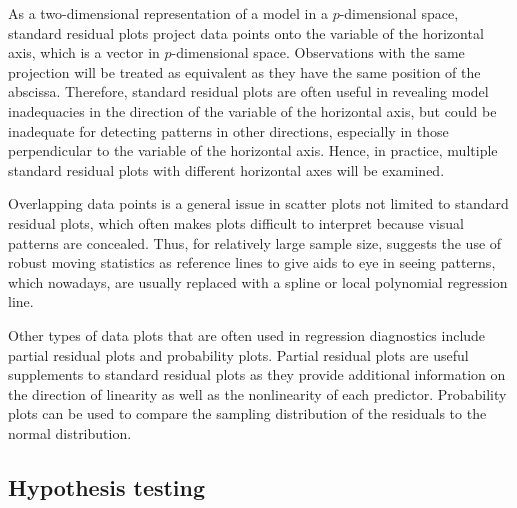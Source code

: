 \documentclass[]{interact}
\theoremstyle{plain}%
\theoremstyle{definition}
\theoremstyle{remark}
\begin{document}
As a two-dimensional representation of a model in a \(p\)-dimensional
space, standard residual plots project data points onto the variable of
the horizontal axis, which is a vector in \(p\)-dimensional space.
Observations with the same projection will be treated as equivalent as
they have the same position of the abscissa. Therefore, standard
residual plots are often useful in revealing model inadequacies in the
direction of the variable of the horizontal axis, but could be
inadequate for detecting patterns in other directions, especially in
those perpendicular to the variable of the horizontal axis. Hence, in
practice, multiple standard residual plots with different horizontal
axes will be examined.

Overlapping data points is a general issue in scatter plots not limited
to standard residual plots, which often makes plots difficult to
interpret because visual patterns are concealed. Thus, for relatively
large sample size, \citet{cleveland1975graphical} suggests the use of
robust moving statistics as reference lines to give aids to eye in
seeing patterns, which nowadays, are usually replaced with a spline or
local polynomial regression line.

Other types of data plots that are often used in regression diagnostics
include partial residual plots and probability plots. Partial residual
plots are useful supplements to standard residual plots as they provide
additional information on the direction of linearity as well as the
nonlinearity of each predictor. Probability plots can be used to compare
the sampling distribution of the residuals to the normal distribution.

\hypertarget{hypothesis-testing}{%
\subsection{Hypothesis testing}\label{hypothesis-testing}}



\end{document}
